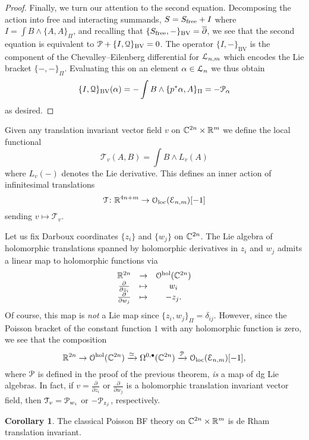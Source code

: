 \documentclass[11pt, oneside, reqno]{amsart}
\theoremstyle{definition} \newtheorem{definition}{Definition}[section]
\newtheorem{corollary}[definition]{Corollary}
\theoremstyle{definition}
\theoremstyle{remark}
\theoremstyle{definition} \newtheorem{remark}[definition]{Remark}
\theoremstyle{definition} \newtheorem{remarks}[definition]{Remarks}
\theoremstyle{definition} \newtheorem{question}[definition]{Question}
\theoremstyle{definition} \newtheorem*{note}{Note}
\theoremstyle{definition} \newtheorem{example}[definition]{Example}
\theoremstyle{definition} \newtheorem{examples}[definition]{Examples}
\def\oloc{\mathcal{O}_{\rm loc}}
\def\bu{\bullet}
\def\xto{\xrightarrow}
\def\cE{\mathcal E}\def\cF{\mathcal F}\def\cG{\mathcal G}\def\cH{\mathcal H}
\def\cQ{\mathcal Q}\def\cR{\mathcal R}\def\cS{\mathcal S}\def\cT{\mathcal T}
\newcommand{\dbar}{\overline{\partial}}
\newcommand{\mr}[1]{\mathrm{#1}}
\begin{document}
\begin{proof}
Finally, we turn our attention to the second equation.
Decomposing the action into free and interacting summands, $S = S_{\rm free} + I$ where $I = \int B \wedge \{A, A\}_\Pi$, and recalling that $\{S_{\rm free} , -\}_{\mr{BV}} = \dbar$, we see that the second equation is equivalent to $\cP + \{I, \cQ\}_{\mr{BV}} = 0$. 
The operator $\{I, -\}_{\mr{BV}}$ is the component of the Chevalley--Eilenberg differential for $\mathcal L_{n,m}$ which encodes the Lie bracket $\{-,-\}_\Pi$.
Evaluating this on an element $\alpha \in \mathcal L_n$ we thus obtain
\begin{equation} \label{eqn:Q2}
\{I, \cQ\}_{\mr{BV}} (\alpha) = - \int B \wedge \{p^* \alpha, A\}_\Pi = - \cP_\alpha
\end{equation}
as desired. 
\end{proof}

Given any translation invariant vector field $v$ on $\mathbb C^{2n} \times \mathbb R^m$ we define the local functional
\begin{equation}\label{eqn:T}
\cT_v (A, B) = \int B \wedge L_{v} (A) 
\end{equation}
where $L_v (-)$ denotes the Lie derivative. 
This defines an inner action of infinitesimal translations 
\[\cT \colon \RR^{4n + m} \to \oloc(\cE_{n,m})[-1]\] 
sending $v \mapsto \cT_v$. 

Let us fix Darboux coordinates $\{z_i\}$ and $\{w_j\}$ on $\mathbb C^{2n}$. 
The Lie algebra of holomorphic translations spanned by holomorphic derivatives in $z_i$ and $w_j$ admits a linear map to holomorphic functions via 
\[
\begin{array}{ccccccc}
\mathbb R^{2n} & \to & \mathcal O^{\rm hol}(\mathbb C^{2n})\\
\frac{\partial}{\partial z_i} & \mapsto & w_i \\
\frac{\partial}{\partial w_j} & \mapsto & - z_j .
\end{array}
\]
Of course, this map is {\em not} a Lie map since $\{z_i, w_j \}_\Pi = \delta_{ij}$. 
However, since the Poisson bracket of the constant function $1$ with any holomorphic function is zero, we see that the composition 
\[
\RR^{2n} \to \cO^{\rm hol} (\CC^{2n}) \xto{\simeq} \Omega^{0,\bu}(\CC^{2n}) \xto{\cP} \oloc(\cE_{n,m}) [-1] ,
\]
where $\mathcal P$ is defined in the proof of the previous theorem, {\em is} a map of dg Lie algebras. 
In fact, if $v = \frac{\partial}{\partial z_i}$ or $\frac{\partial}{\partial w_j}$ is a holomorphic translation invariant vector field, then $\cT_v = \cP_{w_i}$ or $-\mathcal P_{z_j}$, respectively. 

\begin{corollary}
The classical Poisson BF theory on $\mathbb C^{2n} \times \mathbb R^m$ is de Rham translation invariant. 
\end{corollary}
\end{document}
